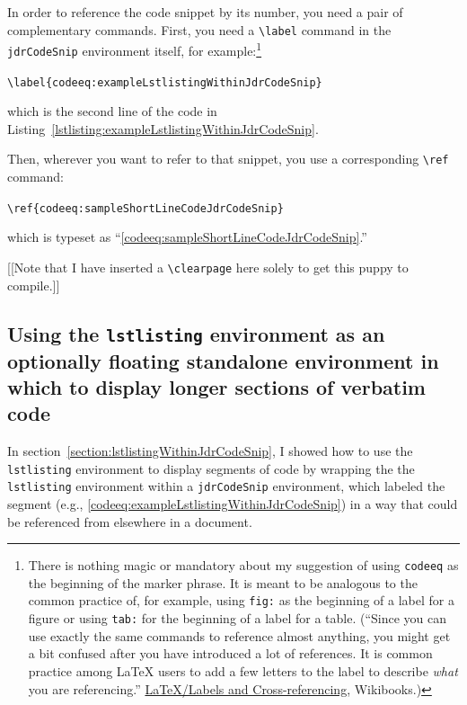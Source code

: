 \documentclass[12pt,table,final]{article}%
\begin{document}
In order to reference the code snippet by its number, you need a pair of complementary commands. First, you need a \lstinline|\label| command in the \lstinline|jdrCodeSnip| environment itself, for example:\footnote{There is nothing magic or mandatory about my suggestion of using \lstinline|codeeq| as the beginning of the marker phrase. It is meant to be analogous to the common practice of, for example, using \lstinline|fig:| as the beginning of a label for a figure or using \lstinline|tab:| for the beginning of a label for a table. (``Since you can use exactly the same commands to reference almost anything, you might get a bit confused after you have introduced a lot of references. It is common practice among \LaTeX{} users to add a few letters to the label to describe \emph{what} you are referencing.'' \href{https://en.wikibooks.org/wiki/LaTeX/Labels_and_Cross-referencing}{\LaTeX/Labels and Cross-referencing}, Wikibooks.)}
\begin{jdrCodeSnip}
\lstinline|\label{codeeq:exampleLstlistingWithinJdrCodeSnip}|
\end{jdrCodeSnip}
which is the second line of the code in Listing~\ref{lstlisting:exampleLstlistingWithinJdrCodeSnip}.

Then, wherever you want to refer to that snippet, you use a corresponding \lstinline|\ref| command:
\begin{jdrCodeSnip}
\lstinline|\ref{codeeq:sampleShortLineCodeJdrCodeSnip}|
\end{jdrCodeSnip}
which is typeset as ``\ref{codeeq:sampleShortLineCodeJdrCodeSnip}.''

[[Note that I have inserted a \lstinline|\clearpage| here solely to get this puppy to compile.]]
\clearpage%

\subsection{Using the \lstinline|lstlisting| environment as an optionally floating standalone environment in which to display longer sections of verbatim code}
In section~\ref{section:lstlistingWithinJdrCodeSnip}, I showed how to use the \lstinline|lstlisting| environment to display segments of code by wrapping the the \lstinline|lstlisting| environment within a \lstinline|jdrCodeSnip| environment, which labeled the segment (e.g., \ref{codeeq:exampleLstlistingWithinJdrCodeSnip}) in a way that could be referenced from elsewhere in a document.
\end{document}
